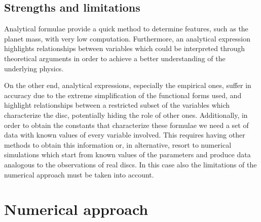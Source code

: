 \documentclass[a4paper,10pt]{report}
\begin{document}
\subsection{Strengths and limitations}

Analytical formulae provide a quick method to determine features, such as the planet mass, with 
very low computation. Furthermore, an analytical expression highlights relationships between variables
which could be interpreted through theoretical arguments in order to achieve a better understanding 
of the underlying physics.

On the other end, analytical expressions, especially the empirical ones, suffer in accuracy due to 
the extreme simplification of the functional forms used, and highlight relationships between a restricted subset of
the variables which characterize the disc, potentially hiding the role of other ones.
Additionally, in order to obtain the constants that characterize these formulae we need a set of
data with known values of every variable involved. This requires having other methods to obtain this information
or, in alternative, resort to numerical simulations which start from known values of the parameters and produce
data analogous to the observations of real discs. In this case also the limitations of the numerical approach must be taken 
into account.

\section{Numerical approach}

\end{document}
